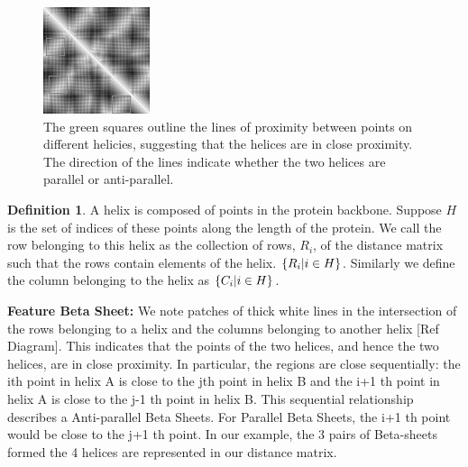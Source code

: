 \documentclass[12pt, a4paper, twocolumn, fullpage]{article}
\theoremstyle{plain}
\theoremstyle{definition}
\newtheorem{defn}{Definition}[section]
\theoremstyle{remark}
\begin{document}
    
\begin{figure}[h]
    \centering
    \includegraphics[width=.7\linewidth]{1ux8matBetaSheets}
    \caption{The green squares outline the lines of proximity between points on different helicies, suggesting that the helices are in close proximity. The direction of the lines indicate whether the two helices are parallel or anti-parallel.}
    \label{1ux8matBetaSheets}
\end{figure}

\begin{defn}
A helix is composed of points in the protein backbone. Suppose $H$ is the set of indices of these points along the length of the protein. We call the row belonging to this helix as the collection of rows, $R_{i}$, of the distance matrix such that the rows contain elements of the helix. $\{R_{i} \space | \space i \in H \}$. Similarly we define the column belonging to the helix as $\{C_{i} \space | \space i \in H \}$.
\end{defn}

\noindent
\textbf{Feature Beta Sheet:}
We note patches of thick white lines in the intersection of the rows belonging to a helix and the columns belonging to another helix [Ref Diagram]. This indicates that the points of the two helices, and hence the two helices, are in close proximity. In particular, the regions are close sequentially: the ith point in helix A is close to the jth point in helix B and the i+1 th point in helix A is close to the j-1 th point in helix B. This sequential relationship describes a Anti-parallel Beta Sheets. For Parallel Beta Sheets, the i+1 th point would be close to the j+1 th point. In our example, the 3 pairs of Beta-sheets formed the 4 helices are represented in our distance matrix.
    
\end{document}
